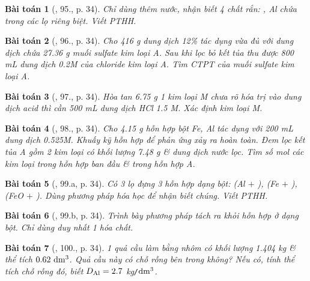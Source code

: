 \documentclass{article}
\newtheorem{baitoan}{Bài toán}
\begin{document}
\begin{baitoan}[\cite{An_400_BT_Hoa_Hoc_9}, 95., p. 34]
	Chỉ dùng thêm nước, nhận biết 4 chất rắn: {\rm{}, Al} chứa trong các lọ riêng biệt. Viết {\rm PTHH}.
\end{baitoan}

\begin{baitoan}[\cite{An_400_BT_Hoa_Hoc_9}, 96., p. 34]
	Cho {\rm416 g} dung dịch {\rm{} 12\%} tác dụng vừa đủ với dung dịch chứa {\rm27.36 g} muối sulfate kim loại A. Sau khi lọc bỏ kết tủa thu được {\rm800 mL} dung dịch {\rm0.2M} của chloride kim loại A. Tìm {\rm CTPT} của muối sulfate kim loại A.
\end{baitoan}

\begin{baitoan}[\cite{An_400_BT_Hoa_Hoc_9}, 97., p. 34]
	Hòa tan {\rm6.75 g} 1 kim loại M chưa rõ hóa trị vào dung dịch acid thì cần {\rm500 mL} dung dịch {\rm HCl 1.5 M}. Xác định kim loại M.
\end{baitoan}

\begin{baitoan}[\cite{An_400_BT_Hoa_Hoc_9}, 98., p. 34]
	Cho {\rm4.15 g} hỗn hợp bột {\rm Fe, Al} tác dụng với {\rm200 mL} dung dịch {\rm{} 0.525M}. Khuấy kỹ hỗn hợp để phản ứng xảy ra hoàn toàn. Đem lọc kết tủa A gồm 2 kim loại có khối lượng {\rm7.48 g} \& dung dịch nước lọc. Tìm số mol các kim loại trong hỗn hợp ban đầu \& trong hỗn hợp A.
\end{baitoan}

\begin{baitoan}[\cite{An_400_BT_Hoa_Hoc_9}, 99.a, p. 34]
	Có 3 lọ đựng 3 hỗn hợp dạng bột: {\rm(Al $+$ ), (Fe $+$ ), (FeO $+$ )}. Dùng phương pháp hóa học để nhận biết chúng. Viết {\rm PTHH}.
\end{baitoan}

\begin{baitoan}[\cite{An_400_BT_Hoa_Hoc_9}, 99.b, p. 34]
	Trình bày phương pháp tách {\rm{}} ra khỏi hỗn hợp {\rm{}} ở dạng bột. Chỉ dùng duy nhất 1 hóa chất.
\end{baitoan}

\begin{baitoan}[\cite{An_400_BT_Hoa_Hoc_9}, 100., p. 34]
	1 quả cầu làm bằng nhôm có khối lượng {\rm1.404 kg} \& thể tích $\rm0.62\ dm^3$. Quả cầu này có chỗ rỗng bên trong không? Nếu có, tính thể tích chỗ rỗng đó, biết $D_{\rm Al} = 2.7$ {\rm kg{\tt/}$\rm dm^3$}.
\end{baitoan}
\end{document}
